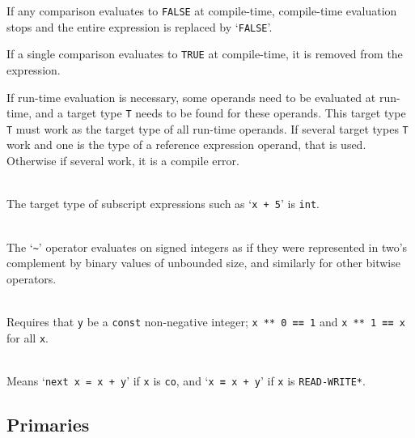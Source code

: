 \documentclass[12pt]{article}
\newcommand{\TT}[1]{{\tt \bfseries #1}}
\newenvironment{indpar}[1][0.3in]%
	{\begin{list}{}%
		     {\setlength{\itemsep}{0in}%
		      \setlength{\topsep}{0in}%
		      \setlength{\parsep}{1ex}%
		      \setlength{\labelwidth}{#1}%
		      \setlength{\leftmargin}{#1}%
		      \addtolength{\leftmargin}{\labelsep}}%
	 \item}%
	{\end{list}}
\begin{document}
\begin{indpar}
      If any comparison evaluates to {\tt FALSE} at compile-time,
      compile-time evaluation stops and the entire expression is replaced by
      `{\tt FALSE}'.

      If a single comparison evaluates to {\tt TRUE} at compile-time,
      it is removed from the expression.

      If run-time evaluation is necessary,
      some operands need to be evaluated
      at run-time, and a target type {\tt T} needs to be found for
      these operands.
      This target type {\tt T} must work as the target type of all
      run-time operands.  If several target types {\tt T} work and
      one is the type of a reference expression operand, that is used.
      Otherwise if several work, it is a compile error.

\hspace*{-0.2in}{\tt v[x+5] \TT{=} y} \\
      The target type of subscript expressions such as `{\tt x + 5}'
      is {\tt int}.

\hspace*{-0.2in}{\tt \TT{\textasciitilde} x} \\
       The `{\tt \textasciitilde}' operator
       evaluates on signed integers as if they were represented
       in two's complement by binary values of unbounded size,
       and similarly for other bitwise operators.

\hspace*{-0.2in}{\tt x \TT{**} y} \\
       Requires that {\tt y} be a {\tt const} non-negative integer;
       {\tt x ** 0 \TT{==} 1} and {\tt x ** 1 \TT{==} x} for all {\tt x}.

\hspace*{-0.2in}{\tt x \TT{+=} y} \\
	Means `{\tt next x = x + y}' if {\tt x} is {\tt co},
	and `{\tt x \TT{=} x + y}' if {\tt x} is {\tt *READ-WRITE*}.
\end{indpar}

\subsection{Primaries}
\label{PRIMARIES}
\end{document}
